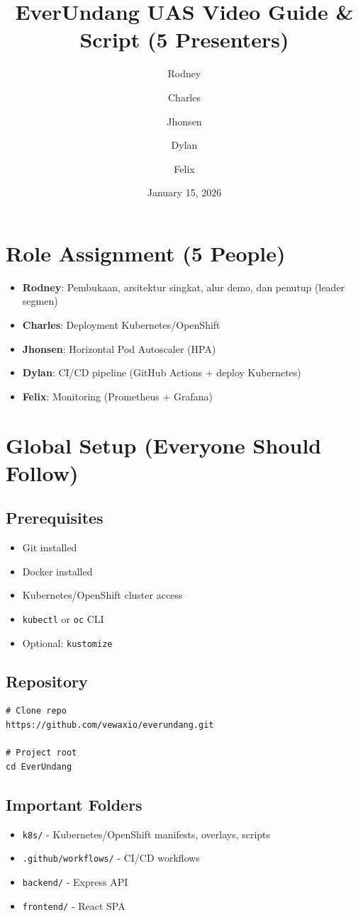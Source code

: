 \documentclass[11pt,a4paper]{article}
\title{EverUndang UAS Video Guide \& Script (5 Presenters)}
\author{Rodney \and Charles \and Jhonsen \and Dylan \and Felix}
\date{January 15, 2026}
\begin{document}
\maketitle

\section{Role Assignment (5 People)}
\begin{itemize}
  \item \textbf{Rodney}: Pembukaan, arsitektur singkat, alur demo, dan penutup (leader segmen)
  \item \textbf{Charles}: Deployment Kubernetes/OpenShift
  \item \textbf{Jhonsen}: Horizontal Pod Autoscaler (HPA)
  \item \textbf{Dylan}: CI/CD pipeline (GitHub Actions + deploy Kubernetes)
  \item \textbf{Felix}: Monitoring (Prometheus + Grafana)
\end{itemize}

\section{Global Setup (Everyone Should Follow)}
\subsection*{Prerequisites}
\begin{itemize}
  \item Git installed
  \item Docker installed
  \item Kubernetes/OpenShift cluster access
  \item \texttt{kubectl} or \texttt{oc} CLI
  \item Optional: \texttt{kustomize}
\end{itemize}

\subsection*{Repository}
\begin{lstlisting}
# Clone repo
https://github.com/vewaxio/everundang.git

# Project root
cd EverUndang
\end{lstlisting}

\subsection*{Important Folders}
\begin{itemize}
  \item \texttt{k8s/} - Kubernetes/OpenShift manifests, overlays, scripts
  \item \texttt{.github/workflows/} - CI/CD workflows
  \item \texttt{backend/} - Express API
  \item \texttt{frontend/} - React SPA
\end{itemize}
\end{document}
